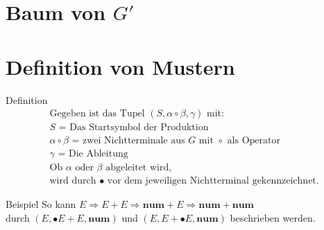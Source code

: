 \documentclass[t]{beamer}
\begin{document}
	\section{Baum von $G'$}\label{sec:baum-von-$g'$}
	\begin{frame}

	\end{frame}


	\section{Definition von Mustern}\label{sec:muster}
	\begin{frame}
		\begin{block}{Definition}
			\vspace{-1em}
			\begin{align*}
				&\text{Gegeben ist das Tupel } (S, \alpha \circ \beta, \gamma) \text{ mit:} \\
				&S \text{ = Das Startsymbol der Produktion} \\
				&\alpha \circ \beta \text{ = zwei Nichtterminale aus } G \text{ mit } \circ \text{ als Operator} \\
				&\gamma \text{ = Die Ableitung} \\
				&\text{Ob } \alpha \text{ oder } \beta \text{ abgeleitet wird,} \\
				&\text{wird durch } \bullet \text{ vor dem jeweiligen Nichtterminal gekennzeichnet.}
			\end{align*}
		\end{block}
		\bigskip
		\begin{exampleblock}{Beispiel}
			So kann $E \Rightarrow E + E \Rightarrow \mathbf{num} + E \Rightarrow \mathbf{num} + \mathbf{num}$ \\ durch
			$(E, \bullet{E}+E, \mathbf{num})$ und $(E, E+\bullet{E}, \mathbf{num})$ beschrieben werden.
		\end{exampleblock}
	\end{frame}
\end{document}
